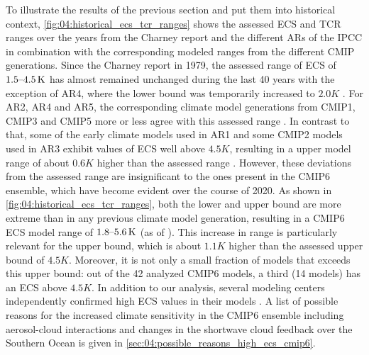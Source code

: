 To illustrate the results of the previous section and put them into historical
context, \cref{fig:04:historical_ecs_tcr_ranges} shows the assessed \ac{ECS}
and \ac{TCR} ranges over the years from the Charney report
\autocite{Charney1979} and the different \acp{AR} of the \ac{IPCC} in
combination with the corresponding modeled ranges from the different \ac{CMIP}
generations. Since the Charney report in 1979, the assessed range of \ac{ECS}
of $\range{1.5}{4.5} \unit{K}$ has almost remained unchanged during the last 40
years \autocite{Charney1979, Mitchell1990, Kattenberg1996, Albritton2001,
  Stocker2013} with the exception of \acs{AR}4, where the lower bound was
temporarily increased to $2.0 \unit{K}$ \autocite{Solomon2007}. For \acs{AR}2,
\acs{AR}4 and \acs{AR}5, the corresponding climate model generations from
\acs{CMIP}1, \acs{CMIP}3 and \acs{CMIP}5 more or less agree with this assessed
range \autocite{Kattenberg1996, Randall2007, Flato2013}. In contrast to that,
some of the early climate models used in \acs{AR}1 and some \acs{CMIP}2 models
used in \acs{AR}3 exhibit values of \acs{ECS} well above $4.5 \unit{K}$,
resulting in a upper model range of about $0.6 \unit{K}$ higher than the
assessed range \autocite{Mitchell1990, Cubasch2001}. However, these deviations
from the assessed range are insignificant to the ones present in the
\acs{CMIP}6 ensemble, which have become evident over the course of 2020. As
shown in \cref{fig:04:historical_ecs_tcr_ranges}, both the lower and upper
bound are more extreme than in any previous climate model generation, resulting
in a \acs{CMIP}6  \ac{ECS} model range of $\range{1.8}{5.6} \unit{K}$ (as of
\TheMonth{}). This increase in range is particularly relevant for the upper
bound, which is about $1.1 \unit{K}$ higher than the assessed upper bound of
$4.5 \unit{K}$. Moreover, it is not only a small fraction of models that
exceeds this upper bound: out of the 42 analyzed \acs{CMIP}6 models, a third
(14 models) has an \ac{ECS} above $4.5 \unit{K}$. In addition to our analysis,
several modeling centers independently confirmed high \ac{ECS} values in their
models \autocite{Andrews2019, Gettelman2019, Wyser2020}. A list of possible
reasons for the increased climate sensitivity in the \acs{CMIP}6 ensemble
including aerosol-cloud interactions and changes in the shortwave cloud
feedback over the Southern Ocean is given in
\cref{sec:04:possible_reasons_high_ecs_cmip6}.

